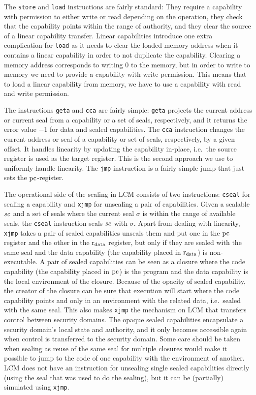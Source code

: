 \documentclass[acmsmall,review,anonymous]{acmart}\settopmatter{printfolios=true,printccs=false,printacmref=false}
\newcommand{\trgcm}{\textsc{LCM}}
\begin{document}
The \texttt{store} and \texttt{load} instructions are fairly standard: They require a capability with permission to either write or read depending on the operation, they check that the capability points within the range of authority, and they clear the source of a linear capability transfer.
Linear capabilities introduce one extra complication for \texttt{load} as it needs to clear the loaded memory address when it contains a linear capability in order to not duplicate the capability.
Clearing a memory address corresponds to writing $0$ to the memory, but in order to write to memory we need to provide a capability with write-permission.
This means that to load a linear capability from memory, we have to use a capability with read and write permission.

The instructions \texttt{geta} and \texttt{cca} are fairly simple: \texttt{geta} projects the current address or current seal from a capability or a set of seals, respectively, and it returns the error value $-1$ for data and sealed capabilities.
The \texttt{cca} instruction changes the current address or seal of a capability or set of seals, respectively, by a given offset.
It handles linearity by updating the capability in-place, i.e.\ the source register is used as the target register.
This is the second approach we use to uniformly handle linearity.
The \texttt{jmp} instruction is a fairly simple jump that just sets the $\mathrm{pc}$-register.

The operational side of the sealing in \trgcm{} consists of two instructions: \texttt{cseal} for sealing a capability and \texttt{xjmp} for unsealing a pair of capabilities.
Given a sealable $\mathit{sc}$ and a set of seals where the current seal $\sigma$ is within the range of available seals, the \texttt{cseal} instruction seals $\mathit{sc}$ with $\sigma$.
Apart from dealing with linearity, \texttt{xjmp} takes a pair of sealed capabilities unseals them and put one in the $\mathrm{pc}$ register and the other in the $\mathrm{r}_\mathrm{data}$ register, but only if they are sealed with the same seal and the data capability (the capability placed in $\mathrm{r}_\mathrm{data}$) is non-executable.
A pair of sealed capabilities can be seen as a closure where the code capability (the capability placed in $\mathrm{pc}$) is the program and the data capability is the local environment of the closure.
Because of the opacity of sealed capability, the creator of the closure can be sure that execution will start where the code capability points and only in an environment with the related data, i.e.\ sealed with the same seal.
This also makes \texttt{xjmp} the mechanism on \trgcm{} that transfers control between security domains.
The opaque sealed capabilities encapsulate a security domain's local state and authority, and it only becomes accessible again when control is transferred to the security domain.
Some care should be taken when sealing as reuse of the same seal for multiple closures would make it possible to jump to the code of one capability with the environment of another.
\trgcm{} does not have an instruction for unsealing single sealed capabilities directly (using the seal that was used to do the sealing), but it can be (partially) simulated using \texttt{xjmp}.
\end{document}
